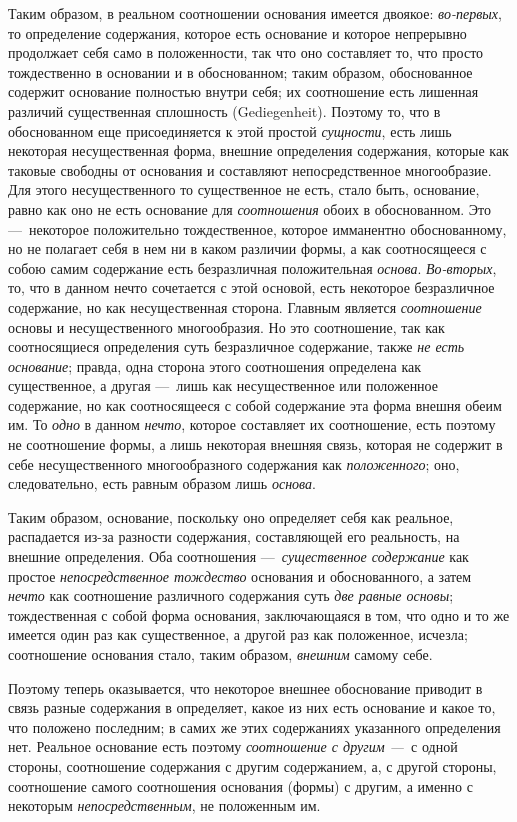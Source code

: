 Таким образом, в реальном соотношении основания имеется двоякое:
{\em во-первых}, то определение содержания, которое
есть основание и которое непрерывно продолжает себя само в положенности,
так что оно составляет то, что просто тождественно в основании и в
обоснованном; таким образом, обоснованное содержит основание полностью
внутри себя; их соотношение есть лишенная различий существенная сплошность
(Gediegenheit). Поэтому то, что в обоснованном еще присоединяется к этой
простой {\em сущности}, есть лишь некоторая
несущественная форма, внешние определения содержания, которые как таковые
свободны от основания и составляют непосредственное многообразие. Для этого
несущественного то существенное не есть, стало быть, основание, равно как
оно не есть основание для {\em соотношения} обоих в
обоснованном. Это —~некоторое положительно тождественное, которое
имманентно обоснованному, но не полагает себя в нем ни в каком различии
формы, а как соотносящееся с собою самим содержание есть безразличная
положительная {\em основа}.
{\em Во-вторых}, то, что в данном нечто сочетается с
этой основой, есть некоторое безразличное содержание, но как несущественная
сторона. Главным является {\em соотношение} основы и
несущественного многообразия. Но это соотношение, так как соотносящиеся
определения суть безразличное содержание, также {\em не
есть основание}; правда, одна сторона этого соотношения определена как
существенное, а другая —~лишь как несущественное или положенное содержание,
но как соотносящееся с собой содержание эта форма внешня обеим им. То
{\em одно} в данном {\em нечто},
которое составляет их соотношение, есть поэтому не соотношение формы, а
лишь некоторая внешняя связь, которая не содержит в себе несущественного
многообразного содержания как {\em положенного}; оно,
следовательно, есть равным образом лишь {\em основа}.

Таким образом, основание, поскольку оно определяет себя как реальное,
распадается из-за разности содержания, составляющей его реальность, на
внешние определения. Оба соотношения
—~{\em существенное содержание} как простое
{\em непосредственное тождество} основания и
обоснованного, а затем {\em нечто} как соотношение
различного содержания суть {\em две равные основы};
тождественная с собой форма основания, заключающаяся в том, что одно и то
же имеется один раз как существенное, а другой раз как положенное, исчезла;
соотношение основания стало, таким образом,
{\em внешним} самому себе.

Поэтому теперь оказывается, что некоторое внешнее обоснование приводит в
связь разные содержания в определяет, какое из них есть основание и какое
то, что положено последним; в самих же этих содержаниях указанного
определения нет. Реальное основание есть поэтому
{\em соотношение с другим —~}с одной стороны,
соотношение содержания с другим содержанием, а, с другой стороны,
соотношение самого соотношения основания (формы) с другим, а именно с
некоторым {\em непосредственным}, не положенным им.



